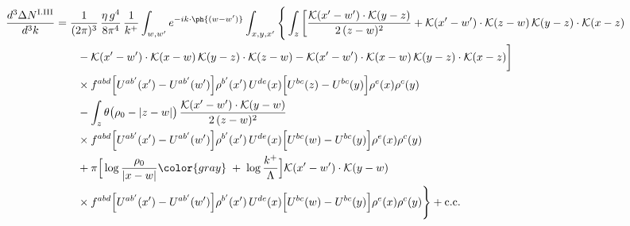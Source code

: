 \begin{align}
\frac{d^{3}\Delta N^{\rm I.III}}{d^{3}k}&=\frac{1}{(2\pi)^{3}}\,\frac{\eta\,g^{4}}{8\pi^{4}}\,\frac{1}{k^{+}}\int_{w,w'}e^{-ik\cdot\ph{(w-w')}}\int_{x,y,x'}\Bigg\{\int_{z}\bigg[\frac{\mathcal{K}(x'-w')\cdot\mathcal{K}(y-z)}{2\,(z-w)^{2}}+\mathcal{K}(x'-w')\cdot\mathcal{K}(z-w)\,\mathcal{K}(y-z)\cdot\mathcal{K}(x-z)\notag\\
&\qquad-\mathcal{K}(x'-w')\cdot\mathcal{K}(x-w)\,\mathcal{K}(y-z)\cdot\mathcal{K}(z-w)-\mathcal{K}(x'-w')\cdot\mathcal{K}(x-w)\,\mathcal{K}(y-z)\cdot\mathcal{K}(x-z)\bigg]\notag\\
&\qquad\times f^{abd}\Big[U^{ab'}(x')-U^{ab'}(w')\Big]\rho^{b'}(x')\,U^{de}(x)\Big[U^{bc}(z)-U^{bc}(y)\Big]\rho^{e}(x)\rho^{c}(y)\notag\\
&\qquad-\int_{z}\theta\big(\rho_{0}-|z-w|\big)\,\frac{\mathcal{K}(x'-w')\cdot\mathcal{K}(y-w)}{2\,(z-w)^{2}}\notag\\
&\qquad\times f^{abd}\Big[U^{ab'}(x')-U^{ab'}(w')\Big]\rho^{b'}(x')\,U^{de}(x)\Big[U^{bc}(w)-U^{bc}(y)\Big]\rho^{e}(x)\rho^{c}(y)\notag\\
&\qquad+\pi\Big[\log\frac{\rho_{0}}{|x-w|}{\color{gray}\;+\;\log\frac{k^{+}}{\Lambda}}\Big]\mathcal{K}(x'-w')\cdot\mathcal{K}(y-w)\notag\\
&\qquad\times f^{abd}\Big[U^{ab'}(x')-U^{ab'}(w')\Big]\rho^{b'}(x')\,U^{de}(x)\Big[U^{bc}(w)-U^{bc}(y)\Big]\rho^{e}(x)\rho^{c}(y)\Bigg\}+{\rm c.c.}\label{eq:B-DN}
\end{align}